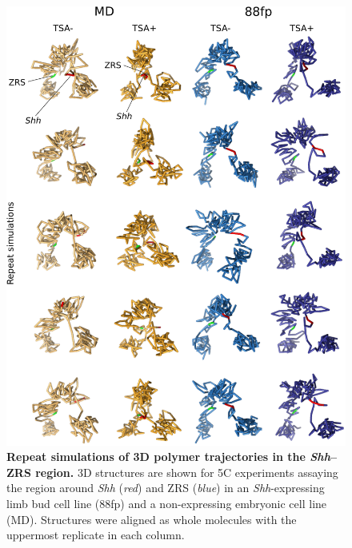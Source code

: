 \documentclass[a4paper,11pt,oneside]{book}
\begin{document}
\begin{figure}
\begin{center} 
\includegraphics[width=5.45in]{figs/3dreps.pdf}
\captionsetup{width=\textwidth} 
\caption[ Repeat simulations of 3D polymer trajectories in the \emph{Shh}--ZRS region. ]{ {\bf Repeat simulations of 3D polymer trajectories in the \emph{Shh}--ZRS region. }
3D structures are shown for 5C experiments assaying the region around \emph{Shh} (\emph{red}) and ZRS (\emph{blue}) in an \emph{Shh}-expressing limb bud cell line (88fp) and a non-expressing embryonic cell line (MD). Structures were aligned as whole molecules with the uppermost replicate in each column.
}\label{fig:3dreps}
\end{center} 
\end{figure} 
\end{document}
